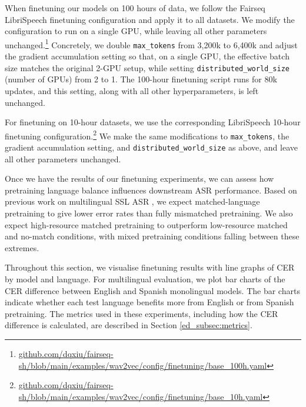 When finetuning our models on 100 hours of data, we follow the Fairseq LibriSpeech finetuning configuration and apply it to all datasets. We modify the configuration to run on a single GPU, while leaving all other parameters unchanged.\footnote{\href{https://github.com/dqxiu/fairseq-sh/blob/main/examples/wav2vec/config/finetuning/base_100h.yaml}{github.com/dqxiu/fairseq-sh/blob/main/examples/wav2vec/config/finetuning/base\_100h.yaml}} Concretely, we double \texttt{max\_tokens} from 3{,}200k to 6{,}400k and adjust the gradient accumulation setting so that, on a single GPU, the effective batch size matches the original 2-GPU setup, while setting \texttt{distributed\_world\_size} (number of GPUs) from 2 to 1. The 100-hour finetuning script runs for 80k updates, and this setting, along with all other hyperparameters, is left unchanged.

For finetuning on 10-hour datasets, we use the corresponding LibriSpeech 10-hour finetuning configuration.\footnote{\href{https://github.com/dqxiu/fairseq-sh/blob/main/examples/wav2vec/config/finetuning/base_10h.yaml}{github.com/dqxiu/fairseq-sh/blob/main/examples/wav2vec/config/finetuning/base\_10h.yaml}} We make the same modifications to \texttt{max\_tokens}, the gradient accumulation setting, and \texttt{distributed\_world\_size} as above, and leave all other parameters unchanged.

Once we have the results of our finetuning experiments, we can assess how pretraining language balance influences downstream ASR performance. Based on previous work on multilingual SSL ASR \cite{ashihara2023exploration, poncelet2021comparison,zhang2023fast, gupta2021clsril}, we expect matched-language pretraining to give lower error rates than fully mismatched pretraining. We also expect high-resource matched pretraining to outperform low-resource matched and no-match conditions, with mixed pretraining conditions falling between these extremes.

Throughout this section, we visualise finetuning results with line graphs of CER by model and language. For multilingual evaluation, we plot bar charts of the CER difference between English and Spanish monolingual models. The bar charts indicate whether each test language benefits more from English or from Spanish pretraining. The metrics used in these experiments, including how the CER difference is calculated, are described in Section \ref{ed_subsec:metrics}.

